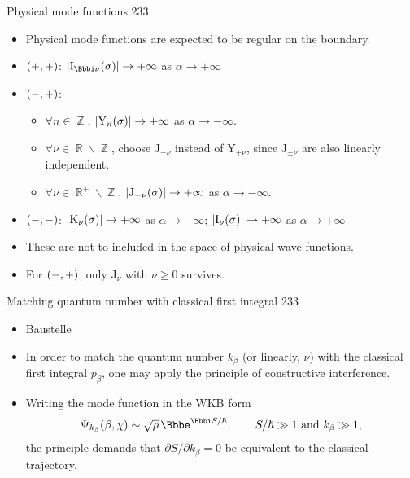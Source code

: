 \documentclass[9pt]{beamer}
\begin{document}
\begin{frame}
{Physical mode functions}%
{233}
\begin{itemize}
\item Physical mode functions are expected to be regular on the boundary.
\item ${\left(+,+\right)}$: $\vbr{\rfun{\mathrm{I}_{\ii\nu}}{\sigma}} \to +\infty$
as $\alpha \to +\infty$
\item ${\left(-,+\right)}$: 
\begin{itemize}
\item
$\forall n \in \BbbZ$, ${\left|{\mathrm{Y}_{n}}\mathopen{}\left(\sigma\right)\mathclose{}\right|} \to +\infty$ as 
$\alpha \to -\infty$.
\item
$\forall\nu\in\BbbR\backslash\BbbZ$, choose $\mathrm{J}_{-\nu}$ instead of 
$\mathrm{Y}_{+\nu}$, since $\mathrm{J}_{\pm\nu}$ are also linearly independent.
\item
$\forall\nu\in\BbbR^+\backslash\BbbZ$, ${\left|{\mathrm{J}_{-\nu}}\mathopen{}\left(\sigma\right)\mathclose{}\right|} 
\to +\infty$ as $\alpha \to -\infty$.
\end{itemize}
\item ${\left(-,-\right)}$: ${\left|{\mathrm{K}_{\nu}}\mathopen{}\left(\sigma\right)\mathclose{}\right|} \to +\infty$
as $\alpha \to -\infty$; ${\left|{\mathrm{I}_{\nu}}\mathopen{}\left(\sigma\right)\mathclose{}\right|} \to +\infty$
as $\alpha \to +\infty$
\item These are not to included in the space of physical wave functions.
\item For ${\left(-,+\right)}$, \alert{only $\mathrm{J}_{\nu}$ with 
$\nu \ge 0$ survives}.
\end{itemize}

\end{frame}


\begin{frame}%
{Matching quantum number with classical first integral}%
{233}
\begin{itemize}
\item Baustelle
\item In order to match the quantum number $k_\beta$ (or \alert{linearly}, 
$\nu$) with the classical first integral $p_\beta$, one may apply the 
\alert{principle of constructive interference}.

\item Writing the mode function in the WKB form
\begin{align}
\rfun{\Psi_{k_\beta}}{\beta,\chi} \sim \sqrt{\rho}\,\ee^{\ii S/\hslash},
\qquad S/\hslash \gg 1\text{ and }k_\beta \gg 1,
\end{align}
the principle demands that $\partial S/\partial k_\beta = 0$ be equivalent to 
the classical trajectory.

\end{itemize}
\end{frame}
\end{document}

